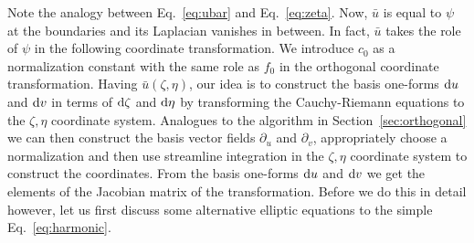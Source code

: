 Note the analogy between Eq.~\eqref{eq:ubar} and Eq.~\eqref{eq:zeta}. Now, $\bar u$ is
equal to $\psi$ at the boundaries and its Laplacian vanishes in between. 
In fact, $\bar u$ takes the role of $\psi$ in the following coordinate
transformation. 
We introduce $c_0$ as a normalization constant with the same role as $f_0$ in the orthogonal coordinate transformation. 
Having $\bar u(\zeta, \eta)$, 
our idea is to construct the basis one-forms $\mathrm{d} u$ and $\mathrm{d} v$  in terms 
of $\mathrm{d} \zeta$ and $\mathrm{d} \eta$ by transforming the Cauchy-Riemann equations to the
$\zeta, \eta$ coordinate system. Analogues to the algorithm in Section~\ref{sec:orthogonal} we can then construct the basis vector fields $\partial_u$ and $\partial_v$, appropriately choose a normalization and then use streamline
integration in the $\zeta, \eta$ coordinate system to construct the coordinates. 
From the basis one-forms $\mathrm{d} u$ and $\mathrm{d} v$ we get the elements of the Jacobian 
matrix of the transformation. 
Before we do this in detail however, let us first discuss some alternative elliptic
equations to the simple Eq.~\eqref{eq:harmonic}.


